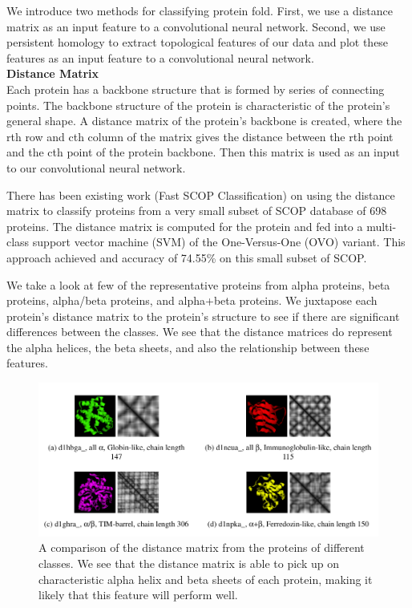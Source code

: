 \documentclass[12pt, a4paper, twocolumn, fullpage]{article}
\theoremstyle{plain}
\theoremstyle{definition}
\theoremstyle{remark}
\begin{document}
We introduce two methods for classifying protein fold. First, we use a distance matrix as an input feature to a convolutional neural network. Second, we use persistent homology to extract topological features of our data and plot these features as an input feature to a convolutional neural network.
\\

\noindent
\textbf{Distance Matrix}\\
Each protein has a backbone structure that is formed by  series of connecting points. The backbone structure of the protein is characteristic of the protein's general shape. A distance matrix of the protein's backbone is created, where the rth row and cth column of the matrix gives the distance between the rth point and the cth point of the protein backbone. Then this matrix is used as an input to our convolutional neural network.

There has been existing work (Fast SCOP Classification) on using the distance matrix to classify proteins from a very small subset of SCOP database \cite{fastSCOP} of 698 proteins. The distance matrix is computed for the protein and fed into a multi-class support vector machine (SVM) of the One-Versus-One (OVO) variant. This approach achieved and accuracy of 74.55\% on this small subset of SCOP. 

We take a look at few of the representative proteins from alpha proteins, beta proteins, alpha/beta proteins, and alpha+beta proteins. We juxtapose each protein's distance matrix to the protein's structure to see if there are significant differences between the classes. We see that the distance matrices do represent the alpha helices, the beta sheets, and also the relationship between these features.

\begin{figure}
	\centering
    \includegraphics[width=\linewidth]{img/SCOP/scopDistCompare.png}
    \caption{A comparison of the distance matrix from the proteins of different classes. We see that the distance matrix is able to pick up on characteristic alpha helix and beta sheets of each protein, making it likely that this feature will perform well.}
    \label{}
\end{figure}
\end{document}
